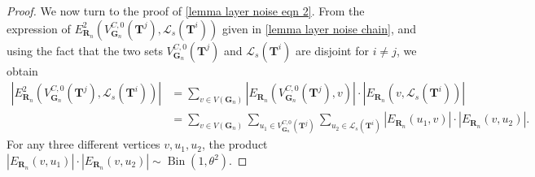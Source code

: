 \documentclass[twoside,11pt]{article}
\theoremstyle{remark}
\begin{document}
\begin{proof}
We now turn to the proof of \eqref{lemma layer noise eqn 2}.  
From the expression of 
$E^{2}_{\boldsymbol{R}_n}\left(
V^{C,0}_{\boldsymbol{G}_n}\left(\boldsymbol{T}^j\right),  \mathcal{L}_s\left(\boldsymbol{T}^{i}\right)\right)$ 
given in \eqref{lemma layer noise chain}, and using the fact that the two sets 
$V^{C,0}_{\boldsymbol{G}_n}\left(\boldsymbol{T}^j\right)$ and 
$\mathcal{L}_s\left(\boldsymbol{T}^{i}\right)$ are disjoint for $i\neq j$, we obtain
%
\begin{align*}    \left|E^{2}_{\boldsymbol{R}_n}\left(
V^{C,0}_{\boldsymbol{G}_n}\left(\boldsymbol{T}^j\right),  \mathcal{L}_s\left(\boldsymbol{T}^{i}\right)\right)\right|&=\sum_{v\in V\left(\boldsymbol{G}_n\right)}\left|E_{\boldsymbol{R}_n}\left(
V^{C,0}_{\boldsymbol{G}_n}\left(\boldsymbol{T}^j\right),  v\right)\right|\cdot \left|E_{\boldsymbol{R}_n}\left(
v,  \mathcal{L}_s\left(\boldsymbol{T}^{i}\right)\right)\right|\\
&=\sum_{v\in V\left(\boldsymbol{G}_n\right)}\sum_{u_1\in V^{C,0}_{\boldsymbol{G}_n}\left(\bm{T}^j\right)}\sum_{u_2\in \mathcal{L}_s\left(\boldsymbol{T}^{i}\right)}\left|E_{\boldsymbol{R}_n}\left(
u_1,  v\right)\right|\cdot \left|E_{\boldsymbol{R}_n}\left(
v,  u_2\right)\right|.
\end{align*}
%
For any three different vertices $v, u_1, u_2$, the product $\left|E_{\boldsymbol{R}_n}\left(v,u_1\right)\right|\cdot \left|E_{\boldsymbol{R}_n}\left(v,u_2\right)\right|\sim \operatorname{Bin}\left(1,\theta^2\right)$.




\end{proof}
\end{document}
